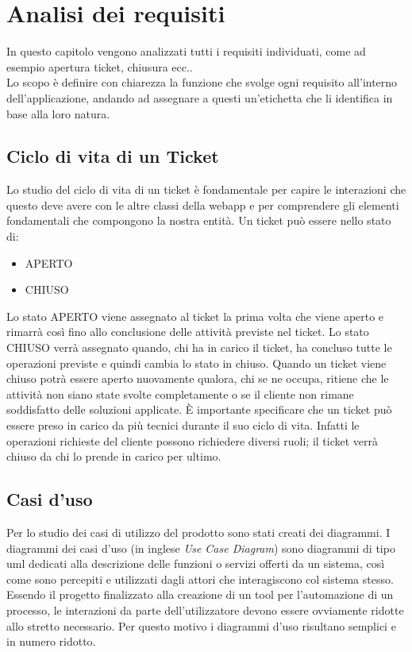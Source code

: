 \chapter{Analisi dei requisiti}
\label{cap:analisi-requisiti}

In questo capitolo vengono analizzati tutti i requisiti individuati, come ad esempio apertura ticket, chiusura ecc..\\
Lo scopo è definire con chiarezza la funzione che svolge ogni requisito all'interno dell'applicazione, andando  ad assegnare a questi un'etichetta che li identifica in base alla  loro natura.
\section{Ciclo di vita di un Ticket}
Lo studio del ciclo di vita di un ticket è fondamentale per capire le interazioni che questo deve avere con le altre classi della webapp e per comprendere gli elementi fondamentali che compongono la nostra entità. Un ticket può essere nello stato di:
\begin{itemize}
\item APERTO
\item CHIUSO
\end{itemize}
Lo stato APERTO viene assegnato al ticket la prima volta che viene aperto e rimarrà così fino allo conclusione delle attività previste nel ticket.
Lo stato CHIUSO verrà assegnato quando, chi ha in carico il ticket, ha concluso tutte le operazioni previste e quindi cambia lo stato in chiuso.
Quando un ticket viene chiuso potrà essere aperto nuovamente qualora, chi se ne occupa, ritiene che le attività non siano state svolte completamente o se il cliente non rimane soddisfatto delle soluzioni applicate.
È importante specificare che un ticket può essere preso in carico da più tecnici durante il suo ciclo di vita. Infatti le operazioni richieste del cliente possono richiedere diversi ruoli; il ticket verrà chiuso da chi lo prende in carico per ultimo.
\section{Casi d'uso}

Per lo studio dei casi di utilizzo del prodotto sono stati creati dei diagrammi.
I diagrammi dei casi d'uso (in inglese \emph{Use Case Diagram}) sono diagrammi di tipo \gls{uml} dedicati alla descrizione delle funzioni o servizi offerti da un sistema, così come sono percepiti e utilizzati dagli attori che interagiscono col sistema stesso.
Essendo il progetto finalizzato alla creazione di un tool per l'automazione di un processo, le interazioni da parte dell'utilizzatore devono essere ovviamente ridotte allo stretto necessario. Per questo motivo i diagrammi d'uso risultano semplici e in numero ridotto.

